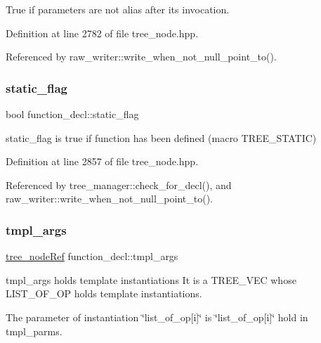 True if parameters are not alias after its invocation. 



Definition at line 2782 of file tree\+\_\+node.\+hpp.



Referenced by raw\+\_\+writer\+::write\+\_\+when\+\_\+not\+\_\+null\+\_\+point\+\_\+to().

\mbox{\label{structfunction__decl_a3faebd1c149b8bb7454c889d15cbb114}} 
\subsubsection{\texorpdfstring{static\+\_\+flag}{static\_flag}}
{\footnotesize\ttfamily bool function\+\_\+decl\+::static\+\_\+flag}



static\+\_\+flag is true if function has been defined (macro T\+R\+E\+E\+\_\+\+S\+T\+A\+T\+IC) 



Definition at line 2857 of file tree\+\_\+node.\+hpp.



Referenced by tree\+\_\+manager\+::check\+\_\+for\+\_\+decl(), and raw\+\_\+writer\+::write\+\_\+when\+\_\+not\+\_\+null\+\_\+point\+\_\+to().

\mbox{\label{structfunction__decl_ace7c0a40b741941cfe82deeeee8e1a2c}} 
\subsubsection{\texorpdfstring{tmpl\+\_\+args}{tmpl\_args}}
{\footnotesize\ttfamily \hyperlink{tree__node_8hpp_a6ee377554d1c4871ad66a337eaa67fd5}{tree\+\_\+node\+Ref} function\+\_\+decl\+::tmpl\+\_\+args}



tmpl\+\_\+args holds template instantiations It is a T\+R\+E\+E\+\_\+\+V\+EC whose L\+I\+S\+T\+\_\+\+O\+F\+\_\+\+OP holds template instantiations. 

The parameter of instantiation \char`\"{}list\+\_\+of\+\_\+op\mbox{[}i\mbox{]}\char`\"{} is \char`\"{}list\+\_\+of\+\_\+op\mbox{[}i\mbox{]}\char`\"{} hold in tmpl\+\_\+parms. 

